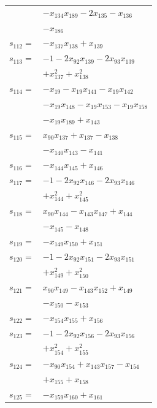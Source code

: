 \begin{longtable}{@{}r@{\;}l@{}}
 & \(\displaystyle -x_{134}x_{189} -2x_{135} -x_{136}\) \\
 & \(\displaystyle -x_{186}\) \\[3pt]
\(s_{112}=\) & \(\displaystyle -x_{137}x_{138} +x_{139}\) \\[3pt]
\(s_{113}=\) & \(\displaystyle -1 -2x_{92}x_{139} -2x_{93}x_{139}\) \\
 & \(\displaystyle +x_{137}^{2} +x_{138}^{2}\) \\[3pt]
\(s_{114}=\) & \(\displaystyle -x_{19} -x_{19}x_{141} -x_{19}x_{142}\) \\
 & \(\displaystyle -x_{19}x_{148} -x_{19}x_{153} -x_{19}x_{158}\) \\
 & \(\displaystyle -x_{19}x_{189} +x_{143}\) \\[3pt]
\(s_{115}=\) & \(\displaystyle x_{90}x_{137} +x_{137} -x_{138}\) \\
 & \(\displaystyle -x_{140}x_{143} -x_{141}\) \\[3pt]
\(s_{116}=\) & \(\displaystyle -x_{144}x_{145} +x_{146}\) \\[3pt]
\(s_{117}=\) & \(\displaystyle -1 -2x_{92}x_{146} -2x_{93}x_{146}\) \\
 & \(\displaystyle +x_{144}^{2} +x_{145}^{2}\) \\[3pt]
\(s_{118}=\) & \(\displaystyle x_{90}x_{144} -x_{143}x_{147} +x_{144}\) \\
 & \(\displaystyle -x_{145} -x_{148}\) \\[3pt]
\(s_{119}=\) & \(\displaystyle -x_{149}x_{150} +x_{151}\) \\[3pt]
\(s_{120}=\) & \(\displaystyle -1 -2x_{92}x_{151} -2x_{93}x_{151}\) \\
 & \(\displaystyle +x_{149}^{2} +x_{150}^{2}\) \\[3pt]
\(s_{121}=\) & \(\displaystyle x_{90}x_{149} -x_{143}x_{152} +x_{149}\) \\
 & \(\displaystyle -x_{150} -x_{153}\) \\[3pt]
\(s_{122}=\) & \(\displaystyle -x_{154}x_{155} +x_{156}\) \\[3pt]
\(s_{123}=\) & \(\displaystyle -1 -2x_{92}x_{156} -2x_{93}x_{156}\) \\
 & \(\displaystyle +x_{154}^{2} +x_{155}^{2}\) \\[3pt]
\(s_{124}=\) & \(\displaystyle -x_{90}x_{154} +x_{143}x_{157} -x_{154}\) \\
 & \(\displaystyle +x_{155} +x_{158}\) \\[3pt]
\(s_{125}=\) & \(\displaystyle -x_{159}x_{160} +x_{161}\) \\[3pt]

\end{longtable}
